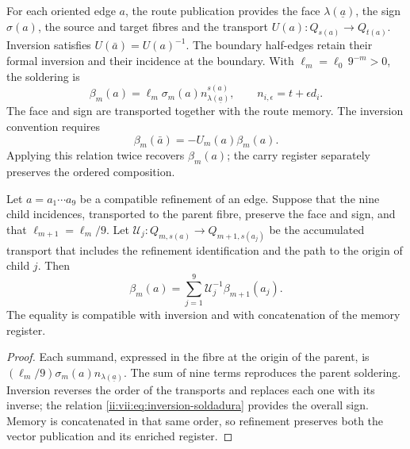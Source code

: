 For each oriented edge \(a\), the route publication provides
the face \(\lambda(\underline a)\), the sign
\(\sigma(a)\), the source and target fibres and the transport
\(U(a):Q_{s(a)}\longrightarrow Q_{t(a)}\).
Inversion satisfies \(U(\bar a)=U(a)^{-1}\).
The boundary half-edges retain their formal inversion and their incidence
at the boundary. With \(\ell_m=\ell_0\,9^{-m}>0\), the soldering is
\begin{equation}
 \beta_m(a)=\ell_m\sigma_m(a)
              n_{\lambda(\underline a)}^{s(a)},\qquad
 n_{i,\epsilon}=t+\epsilon d_i.
 \label{ii:vii:eq:soldadura-arista}
\end{equation}
The face and sign are transported together with the route memory.
The inversion convention requires
\begin{equation}
 \beta_m(\bar a)=-U_m(a)\beta_m(a).
 \label{ii:vii:eq:inversion-soldadura}
\end{equation}
Applying this relation twice recovers \(\beta_m(a)\);
the carry register separately preserves the ordered composition.

\begin{proposition}
\label{ii:vii:prop:refinamiento-soldadura}
Let \(a=a_1\cdots a_9\) be a compatible refinement of an edge.
Suppose that the nine child incidences, transported to the parent
fibre, preserve the face and sign, and that
\(\ell_{m+1}=\ell_m/9\). Let
\(\mathcal U_j:Q_{m,s(a)}\longrightarrow Q_{m+1,s(a_j)}\)
be the accumulated transport that includes the refinement identification
and the path to the origin of child \(j\). Then
\[
 \beta_m(a)=
 \sum_{j=1}^{9}\mathcal U_j^{-1}\beta_{m+1}(a_j).
\]
The equality is compatible with inversion and with concatenation
of the memory register.
\end{proposition}

\begin{proof}
Each summand, expressed in the fibre at the origin of the parent, is
\((\ell_m/9)\sigma_m(a)n_{\lambda(\underline a)}\).
The sum of nine terms reproduces the parent soldering.
Inversion reverses the order of the transports and replaces each one
with its inverse; the relation \eqref{ii:vii:eq:inversion-soldadura} provides
the overall sign. Memory is concatenated in that same order, so
refinement preserves both the vector publication and its
enriched register.
\end{proof}




